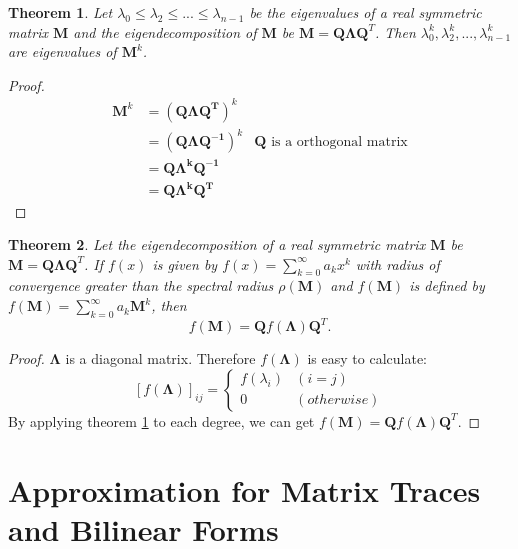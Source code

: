 \documentclass[senior,final,11pt]{iscs-thesis}
\newtheorem{theorem}{Theorem}
\begin{document}
\begin{theorem}
    \label{power_eigenvalues}
    Let $\lambda_0 \leq \lambda_2 \leq ... \leq \lambda_{n-1}$ be the eigenvalues of a real symmetric matrix $\mathbf{M}$ and the eigendecomposition of $\mathbf{M}$ be $\mathbf{M}=\mathbf{Q}\mathbf{\Lambda}\mathbf{Q}^T$. Then $\lambda_0^k, \lambda_2^k, ..., \lambda_{n-1}^k$ are eigenvalues of $\mathbf{M}^k$.
\end{theorem}
\begin{proof}
    \begin{align*}
        \mathbf{M}^k &= (\mathbf{\mathbf{Q}\mathbf{\Lambda}\mathbf{Q}^T})^k \\
        &= (\mathbf{\mathbf{Q}\mathbf{\Lambda}\mathbf{Q}^{-1}})^k &\text{$\mathbf{Q}$ is a orthogonal matrix}\\
        &= \mathbf{\mathbf{Q}\mathbf{\Lambda}^k\mathbf{Q}^{-1}}\\
        &= \mathbf{\mathbf{Q}\mathbf{\Lambda}^k\mathbf{Q}^T}
    \end{align*}
\end{proof}

\begin{theorem}
    Let the eigendecomposition of a real symmetric matrix $\mathbf{M}$ be $\mathbf{M}=\mathbf{Q}\mathbf{\Lambda}\mathbf{Q}^T$. If $f(x)$ is given by $f(x)=\sum_{k=0}^{\infty} a_k x^k$ with radius of convergence greater than the spectral radius $\rho(\mathbf{M})$ and $f(\mathbf{M})$ is defined by $f(\mathbf{M})=\sum_{k=0}^{\infty} a_k \mathbf{M}^k$, then
    \[f(\mathbf{M}) = \mathbf{Q}f(\mathbf{\Lambda})\mathbf{Q}^T.\]
\end{theorem}
\begin{proof}
    $\mathbf{\Lambda}$ is a diagonal matrix. Therefore $f(\mathbf{\Lambda})$ is easy to calculate:
    \[
    [f(\mathbf{\Lambda})]_{ij} = \begin{cases}
        f(\lambda_i) & (i=j) \\
        0 & (otherwise)
        \end{cases}
    \]
    By applying theorem \ref{power_eigenvalues} to each degree, we can get $f(\mathbf{M}) = \mathbf{Q}f(\mathbf{\Lambda})\mathbf{Q}^T$.
\end{proof}

\section{Approximation for Matrix Traces and Bilinear Forms}
\end{document}
